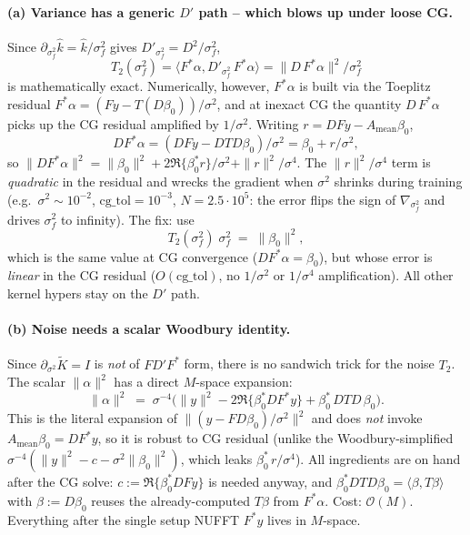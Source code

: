 \documentclass[11pt]{article}
\newcommand{\bigo}{\mathcal{O}}
\newcommand{\Ktil}{\widetilde K}
\begin{document}
\paragraph{(a) Variance has a generic $D'$ path -- which blows up under loose CG.}
Since $\partial_{\sigma_f^2}\hat k = \hat k/\sigma_f^2$ gives $D'_{\sigma_f^2} = D^2/\sigma_f^2$,
\begin{equation}
  T_2(\sigma_f^2) = \langle F^*\alpha, D'_{\sigma_f^2}\, F^*\alpha\rangle
                 = \|D\, F^*\alpha\|^2/\sigma_f^2
\end{equation}
is mathematically exact. Numerically, however, $F^*\alpha$ is built via the Toeplitz residual $F^*\alpha = (Fy - T(D\beta_0))/\sigma^2$, and at inexact CG the quantity $D\,F^*\alpha$ picks up the CG residual amplified by $1/\sigma^2$. Writing $r = D Fy - A_{\text{mean}}\beta_0$,
\begin{equation}
  D F^*\alpha = (D Fy - DTD\beta_0)/\sigma^2 = \beta_0 + r/\sigma^2,
\end{equation}
so $\|D F^*\alpha\|^2 = \|\beta_0\|^2 + 2\Re\{\beta_0^* r\}/\sigma^2 + \|r\|^2/\sigma^4$. The $\|r\|^2/\sigma^4$ term is \emph{quadratic} in the residual and wrecks the gradient when $\sigma^2$ shrinks during training (e.g.\ $\sigma^2 \sim 10^{-2}$, $\mathrm{cg\_tol}=10^{-3}$, $N=2.5{\cdot}10^5$: the error flips the sign of $\nabla_{\sigma_f^2}$ and drives $\sigma_f^2$ to infinity). The fix: use
\begin{equation}
  \boxed{\; T_2(\sigma_f^2)\;\sigma_f^2 \;=\; \|\beta_0\|^2, \;}
\end{equation}
which is the same value at CG convergence ($D F^*\alpha = \beta_0$), but whose error is \emph{linear} in the CG residual ($O(\mathrm{cg\_tol})$, no $1/\sigma^2$ or $1/\sigma^4$ amplification). All other kernel hypers stay on the $D'$ path.

\paragraph{(b) Noise needs a scalar Woodbury identity.}
Since $\partial_{\sigma^2}\Ktil = I$ is \emph{not} of $FD'F^*$ form, there is no sandwich trick for the noise $T_2$. The scalar $\|\alpha\|^2$ has a direct $M$-space expansion:
\begin{equation}
  \boxed{\;\|\alpha\|^2 \;=\; \sigma^{-4}\bigl(\|y\|^2 - 2\Re\{\beta_0^* D F^*y\} + \beta_0^*\, DTD\,\beta_0\bigr).\;}
\end{equation}
This is the literal expansion of $\|(y - FD\beta_0)/\sigma^2\|^2$ and does \emph{not} invoke $A_{\text{mean}}\beta_0 = DF^*y$, so it is robust to CG residual (unlike the Woodbury-simplified $\sigma^{-4}(\|y\|^2 - c - \sigma^2\|\beta_0\|^2)$, which leaks $\beta_0^*\,r/\sigma^4$). All ingredients are on hand after the CG solve: $c := \Re\{\beta_0^* DFy\}$ is needed anyway, and $\beta_0^* DTD \beta_0 = \langle\beta, T\beta\rangle$ with $\beta := D\beta_0$ reuses the already-computed $T\beta$ from $F^*\alpha$. Cost: $\bigo(M)$.
Everything after the single setup NUFFT $F^*y$ lives in $M$-space.
\end{document}
